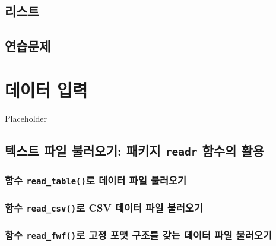 \documentclass[
]{book}
\begin{document}
\hypertarget{section-list}{%
\section{리스트}\label{section-list}}

\hypertarget{uxc5f0uxc2b5uxbb38uxc81c}{%
\section{연습문제}\label{uxc5f0uxc2b5uxbb38uxc81c}}

\hypertarget{uxb370uxc774uxd130-uxc785uxb825}{%
\chapter{데이터 입력}\label{uxb370uxc774uxd130-uxc785uxb825}}

Placeholder

\hypertarget{uxd14duxc2a4uxd2b8-uxd30cuxc77c-uxbd88uxb7ecuxc624uxae30-uxd328uxd0a4uxc9c0-readr-uxd568uxc218uxc758-uxd65cuxc6a9}{%
\section{\texorpdfstring{텍스트 파일 불러오기: 패키지 \texttt{readr} 함수의 활용}{텍스트 파일 불러오기: 패키지 readr 함수의 활용}}\label{uxd14duxc2a4uxd2b8-uxd30cuxc77c-uxbd88uxb7ecuxc624uxae30-uxd328uxd0a4uxc9c0-readr-uxd568uxc218uxc758-uxd65cuxc6a9}}

\hypertarget{uxd568uxc218-read_tableuxb85c-uxb370uxc774uxd130-uxd30cuxc77c-uxbd88uxb7ecuxc624uxae30}{%
\subsection{\texorpdfstring{함수 \texttt{read\_table()}로 데이터 파일 불러오기}{함수 read\_table()로 데이터 파일 불러오기}}\label{uxd568uxc218-read_tableuxb85c-uxb370uxc774uxd130-uxd30cuxc77c-uxbd88uxb7ecuxc624uxae30}}

\hypertarget{uxd568uxc218-read_csvuxb85c-csv-uxb370uxc774uxd130-uxd30cuxc77c-uxbd88uxb7ecuxc624uxae30}{%
\subsection{\texorpdfstring{함수 \texttt{read\_csv()}로 CSV 데이터 파일 불러오기}{함수 read\_csv()로 CSV 데이터 파일 불러오기}}\label{uxd568uxc218-read_csvuxb85c-csv-uxb370uxc774uxd130-uxd30cuxc77c-uxbd88uxb7ecuxc624uxae30}}

\hypertarget{uxd568uxc218-read_fwfuxb85c-uxace0uxc815-uxd3ecuxb9f7-uxad6cuxc870uxb97c-uxac16uxb294-uxb370uxc774uxd130-uxd30cuxc77c-uxbd88uxb7ecuxc624uxae30}{%
\subsection{\texorpdfstring{함수 \texttt{read\_fwf()}로 고정 포맷 구조를 갖는 데이터 파일 불러오기}{함수 read\_fwf()로 고정 포맷 구조를 갖는 데이터 파일 불러오기}}\label{uxd568uxc218-read_fwfuxb85c-uxace0uxc815-uxd3ecuxb9f7-uxad6cuxc870uxb97c-uxac16uxb294-uxb370uxc774uxd130-uxd30cuxc77c-uxbd88uxb7ecuxc624uxae30}}
\end{document}

